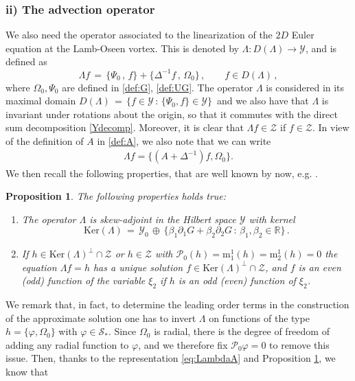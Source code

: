 \documentclass[11pt,reqno,a4paper]{amsart}
\def\RR {\mathbb{R}}
\newcommand{\cP}{\mathcal{P}}
\newcommand{\cS}{\mathcal{S}}
\newcommand{\cY}{\mathcal{Y}}
\newcommand{\cZ}{\mathcal{Z}}
\newcommand{\mrm}{\mathrm{m}}
\newcommand{\1}{\mathbbm{1}}
\newtheorem{proposition}{Proposition}[section]
\theoremstyle{definition}
\theoremstyle{definition}
\numberwithin{equation}{section}
\begin{document}
\subsubsection*{{\rm ii)} 
\textbf{The advection operator}}
We also need the operator associated to the linearization of the $2D$ Euler equation at the Lamb-Oseen vortex. This is denoted by  $\Lambda:D(\Lambda)\to \cY$, and is defined as 
\begin{equation}\label{def:Lambda2}
  \Lambda f \,=\, \bigl\{\Psi_0\,,\,f\bigr\} + \bigl\{\Delta^{-1}f\,,\,\Omega_0\}\,,
  \qquad f \in D(\Lambda)\,, 
\end{equation}
where $\Omega_0,\Psi_0$ are  defined in \cref{def:G}, \cref{def:UG}. 
The operator $\Lambda$ is considered in its maximal domain
$  D(\Lambda) \,=\, \bigl\{f\in \cY \, : \, \{\Psi_0, f\} \in \cY\bigr\}\,$ and we also have that  $\Lambda$ is invariant under rotations
about the origin, so that it commutes with the  direct sum decomposition
\cref{Ydecomp}. Moreover, it is clear that $\Lambda f \in \cZ$ if $f \in \cZ$. In view of the definition of $A$ in \cref{def:A}, we also note that we can write 
\begin{align}
\label{eq:LambdaA}
    \Lambda f=\{(A+\Delta^{-1})f,\Omega_0\}.
\end{align}
We then recall the following properties, that are well known by now, e.g. \cite{Gallay2011}.
\begin{proposition}\label{prop:Lambda}
The following properties holds true:
\begin{enumerate}
    \item The operator $\Lambda$ is skew-adjoint in the Hilbert space $\cY$ with
kernel 
\begin{equation}\label{kerLam}
  \mathrm{Ker}(\Lambda) \,=\, \cY_0 \,\oplus\, \bigl\{\beta_1\partial_1 G +
  \beta_2\partial_2 G  \,:\, \beta_1, \beta_2 \in \RR\bigr\}\,.
\end{equation}
\item If $h \in \mathrm{Ker}(\Lambda)^\perp \cap \cZ$ or $h\in \cZ$ with $\cP_0(h)=\mrm^1_1(h)=\mrm^1_2(h)=0$ the equation $\Lambda f = h$
has a unique solution $f \in \mathrm{Ker}(\Lambda)^\perp \cap \cZ$, and $f$ is an
even (odd) function of the variable $\xi_2$ if $h$ is an odd (even) function of $\xi_2$.
\end{enumerate}
\end{proposition}
We remark that, in fact, to determine the leading order terms in the construction of the approximate solution one has to invert $\Lambda$ on functions of the type $h=\{\varphi,\Omega_0\}$ with $\varphi\in \cS_*$. Since $\Omega_0$ is radial, there is the degree of freedom of adding any radial function to $\varphi$, and we therefore fix $\cP_0\varphi=0$ to remove this issue. Then, thanks to the representation \cref{eq:LambdaA} and Proposition \ref{prop:Lambda}, we know that 
\end{document}
